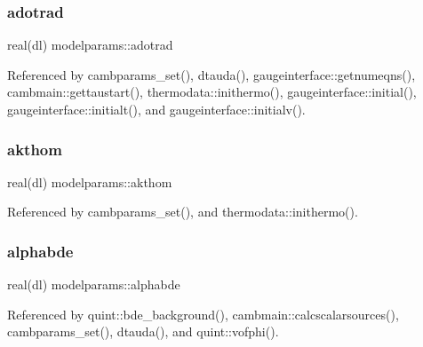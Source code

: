 \mbox{\label{namespacemodelparams_a4e46748f7df40701a9962f9ddac9544e}} 
\subsubsection{\texorpdfstring{adotrad}{adotrad}}
{\footnotesize\ttfamily real(dl) modelparams\+::adotrad}



Referenced by cambparams\+\_\+set(), dtauda(), gaugeinterface\+::getnumeqns(), cambmain\+::gettaustart(), thermodata\+::inithermo(), gaugeinterface\+::initial(), gaugeinterface\+::initialt(), and gaugeinterface\+::initialv().

\mbox{\label{namespacemodelparams_a5dc004ca6b9a5a2f7372357e5a481de7}} 
\subsubsection{\texorpdfstring{akthom}{akthom}}
{\footnotesize\ttfamily real(dl) modelparams\+::akthom}



Referenced by cambparams\+\_\+set(), and thermodata\+::inithermo().

\mbox{\label{namespacemodelparams_a0a62f172d9cb5307499eada437c8f282}} 
\subsubsection{\texorpdfstring{alphabde}{alphabde}}
{\footnotesize\ttfamily real(dl) modelparams\+::alphabde}



Referenced by quint\+::bde\+\_\+background(), cambmain\+::calcscalarsources(), cambparams\+\_\+set(), dtauda(), and quint\+::vofphi().

\mbox{\label{namespacemodelparams_ad4f70e5f61b1f44ff823eb7f25e96b45}} 
